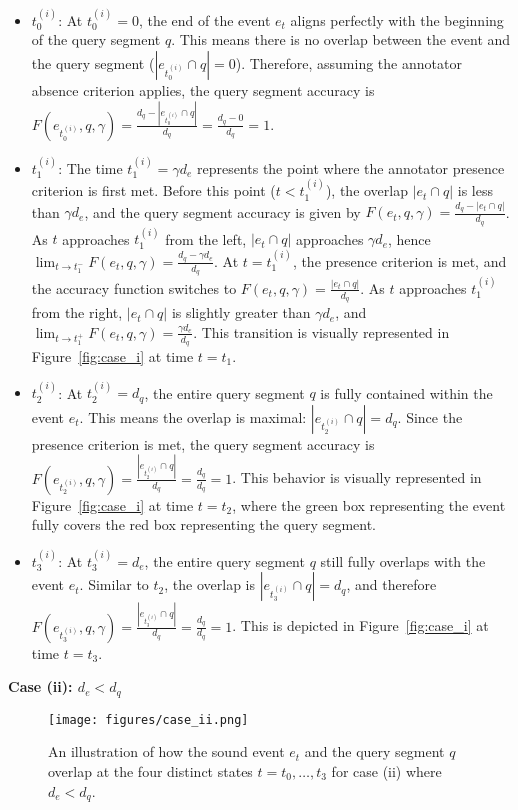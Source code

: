 \begin{itemize}
    \item $t^{(i)}_0$: At $t^{(i)}_0 = 0$, the end of the event $e_t$ aligns perfectly with the beginning of the query segment $q$. This means there is no overlap between the event and the query segment ($|e_{t^{(i)}_0} \cap q| = 0$). Therefore, assuming the annotator absence criterion applies, the query segment accuracy is $F(e_{t^{(i)}_0}, q, \gamma) = \frac{d_q - |e_{t^{(i)}_0} \cap q|}{d_q} = \frac{d_q - 0}{d_q} = 1$.
    \item $t^{(i)}_1$: The time $t^{(i)}_1 = \gamma d_e$ represents the point where the annotator presence criterion is first met. Before this point ($t < t^{(i)}_1$), the overlap $|e_t \cap q|$ is less than $\gamma d_e$, and the query segment accuracy is given by $F(e_t, q, \gamma) = \frac{d_q - |e_t \cap q|}{d_q}$. As $t$ approaches $t^{(i)}_1$ from the left, $|e_t \cap q|$ approaches $\gamma d_e$, hence $\lim_{t \to t_1^-} F(e_{t}, q, \gamma) = \frac{d_q - \gamma d_e}{d_q}$. At $t = t^{(i)}_1$, the presence criterion is met, and the accuracy function switches to $F(e_t, q, \gamma) = \frac{|e_t \cap q|}{d_q}$. As $t$ approaches $t^{(i)}_1$ from the right, $|e_t \cap q|$ is slightly greater than $\gamma d_e$, and $\lim_{t \to t_1^+} F(e_{t}, q, \gamma) = \frac{\gamma d_e}{d_q}$. This transition is visually represented in Figure~\ref{fig:case_i} at time $t=t_1$.
    \item $t^{(i)}_2$: At $t^{(i)}_2 = d_q$, the entire query segment $q$ is fully contained within the event $e_t$. This means the overlap is maximal: $|e_{t^{(i)}_2} \cap q| = d_q$. Since the presence criterion is met, the query segment accuracy is $F(e_{t^{(i)}_2}, q, \gamma) = \frac{|e_{t^{(i)}_2} \cap q|}{d_q} = \frac{d_q}{d_q} = 1$. This behavior is visually represented in Figure~\ref{fig:case_i} at time $t=t_2$, where the green box representing the event fully covers the red box representing the query segment.
    \item $t^{(i)}_3$: At $t^{(i)}_3 = d_e$, the entire query segment $q$ still fully overlaps with the event $e_t$. Similar to $t_2$, the overlap is $|e_{t^{(i)}_3} \cap q| = d_q$, and therefore $F(e_{t^{(i)}_3}, q, \gamma) = \frac{|e_{t^{(i)}_3} \cap q|}{d_q} = \frac{d_q}{d_q} = 1$. This is depicted in Figure~\ref{fig:case_i} at time $t=t_3$.
\end{itemize}

\textbf{Case (ii): $d_e < d_q$}

\begin{figure}[H]
    \centering
    \texttt{[image: figures/case\_ii.png]}
    \caption{An illustration of how the sound event $e_t$ and the query segment $q$ overlap at the four distinct states $t = t_0, \dots, t_3$ for case (ii) where $d_e < d_q$.}
    \label{fig:case_ii}
\end{figure}

